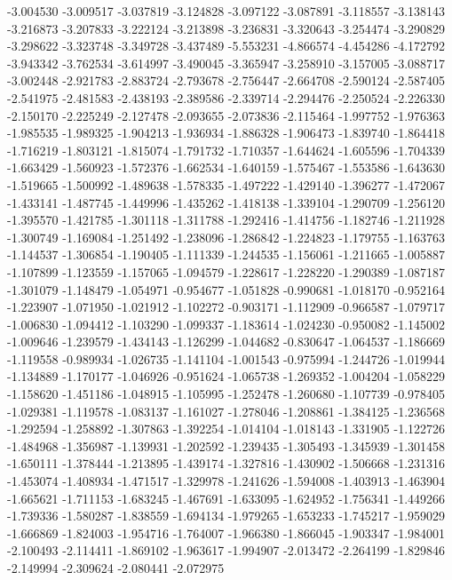 -3.004530
-3.009517
-3.037819
-3.124828
-3.097122
-3.087891
-3.118557
-3.138143
-3.216873
-3.207833
-3.222124
-3.213898
-3.236831
-3.320643
-3.254474
-3.290829
-3.298622
-3.323748
-3.349728
-3.437489
-5.553231
-4.866574
-4.454286
-4.172792
-3.943342
-3.762534
-3.614997
-3.490045
-3.365947
-3.258910
-3.157005
-3.088717
-3.002448
-2.921783
-2.883724
-2.793678
-2.756447
-2.664708
-2.590124
-2.587405
-2.541975
-2.481583
-2.438193
-2.389586
-2.339714
-2.294476
-2.250524
-2.226330
-2.150170
-2.225249
-2.127478
-2.093655
-2.073836
-2.115464
-1.997752
-1.976363
-1.985535
-1.989325
-1.904213
-1.936934
-1.886328
-1.906473
-1.839740
-1.864418
-1.716219
-1.803121
-1.815074
-1.791732
-1.710357
-1.644624
-1.605596
-1.704339
-1.663429
-1.560923
-1.572376
-1.662534
-1.640159
-1.575467
-1.553586
-1.643630
-1.519665
-1.500992
-1.489638
-1.578335
-1.497222
-1.429140
-1.396277
-1.472067
-1.433141
-1.487745
-1.449996
-1.435262
-1.418138
-1.339104
-1.290709
-1.256120
-1.395570
-1.421785
-1.301118
-1.311788
-1.292416
-1.414756
-1.182746
-1.211928
-1.300749
-1.169084
-1.251492
-1.238096
-1.286842
-1.224823
-1.179755
-1.163763
-1.144537
-1.306854
-1.190405
-1.111339
-1.244535
-1.156061
-1.211665
-1.005887
-1.107899
-1.123559
-1.157065
-1.094579
-1.228617
-1.228220
-1.290389
-1.087187
-1.301079
-1.148479
-1.054971
-0.954677
-1.051828
-0.990681
-1.018170
-0.952164
-1.223907
-1.071950
-1.021912
-1.102272
-0.903171
-1.112909
-0.966587
-1.079717
-1.006830
-1.094412
-1.103290
-1.099337
-1.183614
-1.024230
-0.950082
-1.145002
-1.009646
-1.239579
-1.434143
-1.126299
-1.044682
-0.830647
-1.064537
-1.186669
-1.119558
-0.989934
-1.026735
-1.141104
-1.001543
-0.975994
-1.244726
-1.019944
-1.134889
-1.170177
-1.046926
-0.951624
-1.065738
-1.269352
-1.004204
-1.058229
-1.158620
-1.451186
-1.048915
-1.105995
-1.252478
-1.260680
-1.107739
-0.978405
-1.029381
-1.119578
-1.083137
-1.161027
-1.278046
-1.208861
-1.384125
-1.236568
-1.292594
-1.258892
-1.307863
-1.392254
-1.014104
-1.018143
-1.331905
-1.122726
-1.484968
-1.356987
-1.139931
-1.202592
-1.239435
-1.305493
-1.345939
-1.301458
-1.650111
-1.378444
-1.213895
-1.439174
-1.327816
-1.430902
-1.506668
-1.231316
-1.453074
-1.408934
-1.471517
-1.329978
-1.241626
-1.594008
-1.403913
-1.463904
-1.665621
-1.711153
-1.683245
-1.467691
-1.633095
-1.624952
-1.756341
-1.449266
-1.739336
-1.580287
-1.838559
-1.694134
-1.979265
-1.653233
-1.745217
-1.959029
-1.666869
-1.824003
-1.954716
-1.764007
-1.966380
-1.866045
-1.903347
-1.984001
-2.100493
-2.114411
-1.869102
-1.963617
-1.994907
-2.013472
-2.264199
-1.829846
-2.149994
-2.309624
-2.080441
-2.072975
